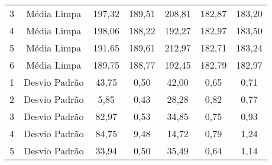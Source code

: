 \begin{table}[]
\begin{tabular}{|c|c|ccccc|}
3                         & Média Limpa                                                                & 197,32                     & 189,51                     & 208,81                     & 182,87                     & 183,20                      \\
4                         & Média Limpa                                                                & 198,06                     & 188,22                     & 192,27                     & 182,97                     & 183,50                      \\
5                         & Média Limpa                                                                & 191,65                     & 189,61                     & 212,97                     & 182,71                     & 183,24                      \\
6                         & Média Limpa                                                                & 189,75                     & 188,77                     & 192,45                     & 182,79                     & 182,97                      \\ \hline
1                         & Desvio Padrão                                                              & 43,75                      & 0,50                       & 42,00                      & 0,65                       & 0,71                        \\
2                         & Desvio Padrão                                                              & 5,85                       & 0,43                       & 28,28                      & 0,82                       & 0,77                        \\
3                         & Desvio Padrão                                                              & 82,97                      & 0,53                       & 34,85                      & 0,75                       & 0,93                        \\
4                         & Desvio Padrão                                                              & 84,75                      & 9,48                       & 14,72                      & 0,79                       & 1,24                        \\
5                         & Desvio Padrão                                                              & 33,94                      & 0,50                       & 35,49                      & 0,64                       & 1,14                        \\

\end{tabular}
\end{table}
